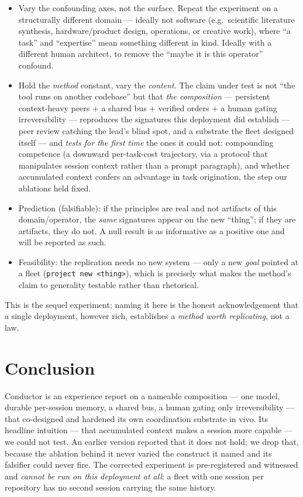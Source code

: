 \documentclass[10pt,conference]{IEEEtran}   %
\begin{document}
\begin{itemize}
\item Vary the confounding axes, not the surface. Repeat the experiment on a
  structurally different domain --- ideally not software (e.g.\ scientific literature
  synthesis, hardware/product design, operations, or creative work), where ``a task'' and
  ``expertise'' mean something different in kind. Ideally with a different human
  architect, to remove the ``maybe it is this operator'' confound.
\item Hold the \emph{method} constant, vary the \emph{content}. The claim under test is
  not ``the tool runs on another codebase'' but that \emph{the composition} --- persistent
  context-heavy peers + a shared bus + verified orders + a human gating irreversibility ---
  reproduces the signatures this deployment did establish --- peer review catching the
  lead's blind spot, and a substrate the fleet designed itself --- and \emph{tests for the first
  time} the ones it could not: compounding competence (a downward per-task-cost trajectory, via a
  protocol that manipulates session context rather than a prompt paragraph), and whether
  accumulated context confers an advantage in task origination, the step our ablations held fixed.
\item Prediction (falsifiable): if the principles are real and not artifacts of this
  domain/operator, the \emph{same} signatures appear on the new ``thing''; if they are artifacts,
  they do not. A null result is as informative as a positive one and will be reported as such.
\item Feasibility: the replication needs no new system --- only a new \emph{goal}
  pointed at a fleet (\texttt{project new <thing>}), which is precisely what makes the method's
  claim to generality testable rather than rhetorical.
\end{itemize}

This is the sequel experiment; naming it here is the honest acknowledgement that a single
deployment, however rich, establishes a \emph{method worth replicating}, not a law.

\section{Conclusion}
\label{sec:concl}
Conductor is an experience report on a nameable composition --- one model, durable per-session
memory, a shared bus, a human gating only irreversibility --- that co-designed and hardened its
own coordination substrate in vivo. Its headline intuition --- that accumulated context makes a session more capable --- we could not
test. An earlier version reported that it does not hold; we drop that, because the ablation
behind it never varied the construct it named and its falsifier could never fire. The corrected
experiment is pre-registered and witnessed and \emph{cannot be run on this deployment at all}: a
fleet with one session per repository has no second session carrying the same history.
\end{document}
